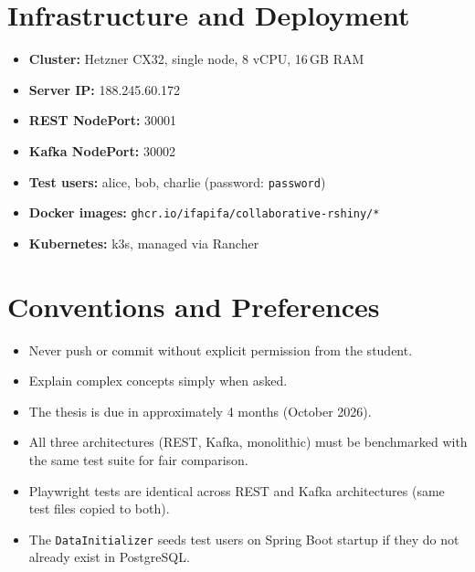 \documentclass[12pt,a4paper]{article}
\begin{document}
\section{Infrastructure and Deployment}

\begin{itemize}[nosep]
  \item \textbf{Cluster:} Hetzner CX32, single node, 8 vCPU, 16\,GB RAM
  \item \textbf{Server IP:} 188.245.60.172
  \item \textbf{REST NodePort:} 30001
  \item \textbf{Kafka NodePort:} 30002
  \item \textbf{Test users:} alice, bob, charlie (password: \texttt{password})
  \item \textbf{Docker images:} \texttt{ghcr.io/ifapifa/collaborative-rshiny/*}
  \item \textbf{Kubernetes:} k3s, managed via Rancher
\end{itemize}

\section{Conventions and Preferences}

\begin{itemize}[nosep]
  \item Never push or commit without explicit permission from the student.
  \item Explain complex concepts simply when asked.
  \item The thesis is due in approximately 4 months (October 2026).
  \item All three architectures (REST, Kafka, monolithic) must be benchmarked
        with the same test suite for fair comparison.
  \item Playwright tests are identical across REST and Kafka architectures
        (same test files copied to both).
  \item The \texttt{DataInitializer} seeds test users on Spring Boot startup
        if they do not already exist in PostgreSQL.
\end{itemize}

\end{document}
